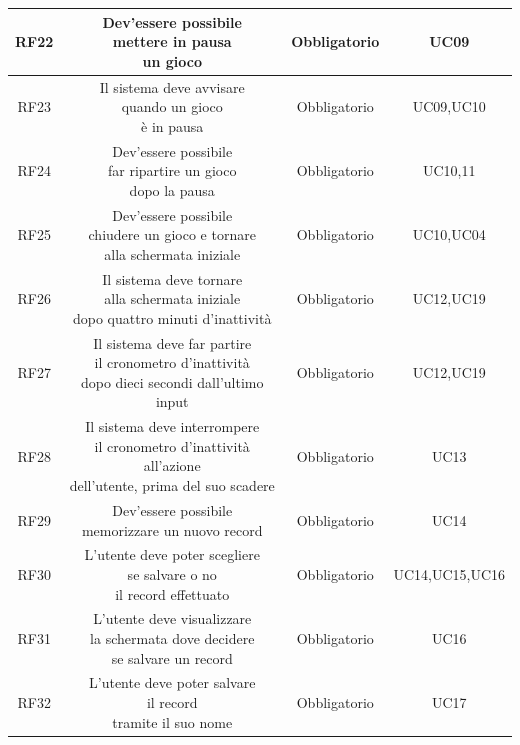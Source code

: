 \begin{longtable}{|c|c|c|c|}
    \hline
    RF22&\makecell{Dev'essere possibile \\ mettere in pausa \\ un gioco}&Obbligatorio&UC09\\
    \hline
    RF23&\makecell{Il sistema deve avvisare \\ quando un gioco \\ è in pausa}&Obbligatorio&UC09,UC10\\
    \hline
    RF24&\makecell{Dev'essere possibile \\ far ripartire un gioco \\ dopo la pausa}&Obbligatorio&UC10,11\\
    \hline
    RF25&\makecell{Dev'essere possibile \\ chiudere un gioco e tornare \\ alla schermata iniziale}&Obbligatorio&UC10,UC04\\
    \hline
    RF26&\makecell{Il sistema deve tornare \\ alla schermata iniziale \\ dopo quattro minuti d'inattività}&Obbligatorio&UC12,UC19\\
    \hline
    RF27&\makecell{Il sistema deve far partire \\ il cronometro d'inattività \\ dopo dieci secondi dall'ultimo input}&Obbligatorio&UC12,UC19\\
    \hline
    RF28&\makecell{Il sistema deve interrompere \\ il cronometro d'inattività all'azione \\ dell'utente, prima del suo scadere}&Obbligatorio&UC13\\
    \hline
    RF29&\makecell{Dev'essere possibile \\ memorizzare un nuovo record}&Obbligatorio&UC14\\
    \hline
    RF30&\makecell{L'utente deve poter scegliere \\ se salvare o no \\ il record effettuato}&Obbligatorio&UC14,UC15,UC16\\
    \hline
    RF31&\makecell{L'utente deve visualizzare \\ la schermata dove decidere \\ se salvare un record}&Obbligatorio&UC16\\
    \hline
    RF32&\makecell{L'utente deve poter salvare \\ il record \\ tramite il suo nome}&Obbligatorio&UC17\\

\end{longtable}
